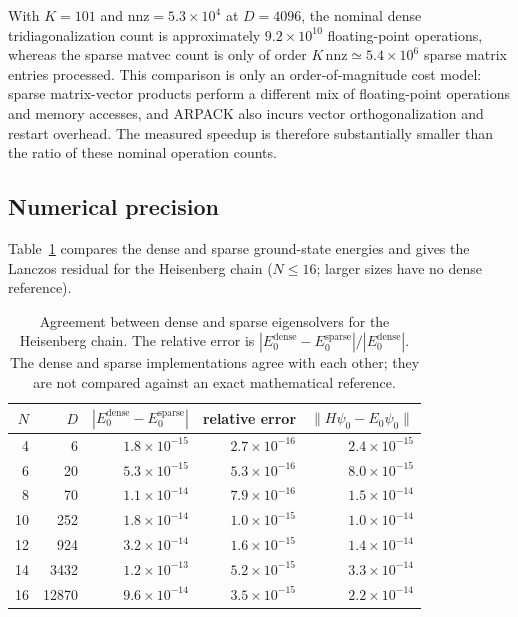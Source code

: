 \documentclass[pdflatex,sn-mathphys-num]{sn-jnl}
\begin{document}
With $K = 101$ and $\mathrm{nnz} = 5.3\times10^{4}$ at $D = 4096$,
the nominal dense tridiagonalization count is approximately
$9.2\times10^{10}$ floating-point operations, whereas the sparse
matvec count is only of order $K\,\mathrm{nnz} \simeq 5.4\times10^{6}$
sparse matrix entries processed. This comparison is only an
order-of-magnitude cost model: sparse matrix-vector products perform
a different mix of floating-point operations and memory accesses, and
ARPACK also incurs vector orthogonalization and restart overhead. The
measured speedup is therefore substantially smaller than the ratio of
these nominal operation counts.

\subsection{Numerical precision}
\label{sec:precision}

Table~\ref{tab:precision} compares the dense and sparse ground-state
energies and gives the Lanczos residual for the Heisenberg chain
($N \le 16$; larger sizes have no dense reference).

\begin{table}[t]
\centering
\small
\caption{Agreement between dense and sparse eigensolvers for the
Heisenberg chain. The relative error is
$|E_0^{\text{dense}} - E_0^{\text{sparse}}| / |E_0^{\text{dense}}|$.
The dense and sparse implementations agree with each other; they are
not compared against an exact mathematical reference.}
\label{tab:precision}
\begin{tabular}{rrrrr}
\toprule
$N$ & $D$ & $|E_0^{\text{dense}} - E_0^{\text{sparse}}|$
    & relative error & $\|H\psi_0 - E_0\psi_0\|$ \\
\midrule
4  & 6     & $1.8 \times 10^{-15}$ & $2.7 \times 10^{-16}$ & $2.4 \times 10^{-15}$ \\
6  & 20    & $5.3 \times 10^{-15}$ & $5.3 \times 10^{-16}$ & $8.0 \times 10^{-15}$ \\
8  & 70    & $1.1 \times 10^{-14}$ & $7.9 \times 10^{-16}$ & $1.5 \times 10^{-14}$ \\
10 & 252   & $1.8 \times 10^{-14}$ & $1.0 \times 10^{-15}$ & $1.0 \times 10^{-14}$ \\
12 & 924   & $3.2 \times 10^{-14}$ & $1.6 \times 10^{-15}$ & $1.4 \times 10^{-14}$ \\
14 & 3432  & $1.2 \times 10^{-13}$ & $5.2 \times 10^{-15}$ & $3.3 \times 10^{-14}$ \\
16 & 12870 & $9.6 \times 10^{-14}$ & $3.5 \times 10^{-15}$ & $2.2 \times 10^{-14}$ \\
\bottomrule
\end{tabular}
\end{table}
\end{document}
